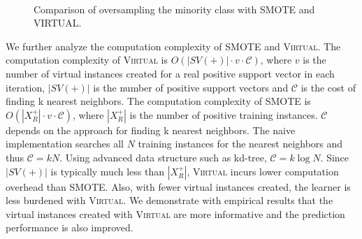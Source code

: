 \begin{figure}[t!]
  \begin{center}
     \mbox{
       \quad
      }
    \caption{Comparison of oversampling the minority class with SMOTE and VIRTUAL. }
    \label{fig:oversample}
  \end{center}
\end{figure}

We further analyze the computation complexity of SMOTE and \textsc{Virtual}. The computation complexity of \textsc{Virtual} is $O(\left|SV(+) \right|\cdot v \cdot \mathcal{C})$, where $v$ is the number of virtual instances created for a real positive support vector in each iteration, $\left|SV(+) \right|$ is the number of positive support vectors and $\mathcal{C}$ is the cost of finding k nearest neighbors. The computation complexity of SMOTE is $O(\left| X_R^+\right| \cdot v \cdot \mathcal{C})$, where $\left| X_R^+\right|$ is the number of positive training instances. $\mathcal{C}$ depends on the approach for finding k nearest neighbors. The naive implementation searches all $N$ training instances for the nearest neighbors and thus $\mathcal{C}=kN$. Using advanced data structure such as kd-tree, $\mathcal{C}=k\log N$. Since $\left|SV(+) \right|$ is typically much less than $\left| X_R^+\right|$, \textsc{Virtual} incurs lower computation overhead than SMOTE. Also, with fewer virtual instances created, the learner is less burdened with \textsc{Virtual}. We demonstrate with empirical results that the virtual instances created with \textsc{Virtual} are more informative and the prediction performance is also improved.

